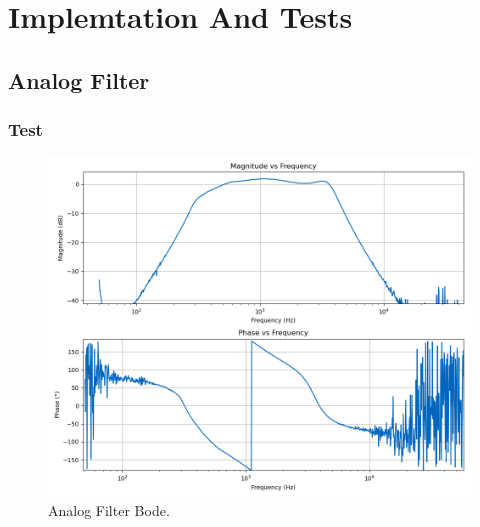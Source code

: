 \section{Implemtation And Tests}

\subsection{Analog Filter}

\subsubsection{Test}

\begin{figure}[H]
    \centering
    \includegraphics*[scale = 0.5]{Images/AnalogFilterScoppyBode.png}
    \caption{Analog Filter Bode.}
    \label{fig:AnalogFilterBodeScoppy}
\end{figure}
